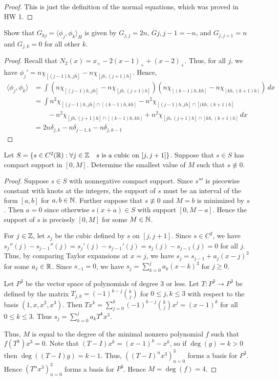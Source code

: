 \documentclass{article}
\begin{document}
\begin{proof}
This is just the definition of the normal equations, which was proved in HW 1.
\end{proof}

 Show that $G_{kj} = \langle \phi_j, \phi_k \rangle_H$ is given by
$G_{j,j} = 2n$, $G{j,j-1} = -n$, and $G_{j, j+1} = n$ and $G_{j,k} = 0$ for all other $k$.
\begin{proof}
Recall that $N_2(x) = x_+ - 2(x-1)_+ + (x-2)_+$. Thus, for all $j$, we have $\phi_j' = n \chi_{[(j-1)h, jh]} -n \chi_{[jh, (j+1)h]}$.  
Hence,
\begin{align*}
\langle \phi_j, \phi_k \rangle  & = \int (n \chi_{[(j-1)h, jh]} -n \chi_{[jh, (j+1)h]})(n \chi_{[(k-1)h, kh]} -n \chi_{[kh, (k+1)h]}) \, dx
\\ & = \int n^2 \chi_{[(j-1)h, jh] \cap [(k-1)h, kh]} - n^2 \chi_{[(j-1)h, jh] \cap [(kh, (k+1)h]}
\\ & \quad \quad - n^2 \chi_{[jh, (j+1)h] \cap [(k-1)h, kh]} + n^2 \chi_{[jh, (j+1)h] \cap [kh, (k+1)h]} \, dx
\\ & = 2n \delta_{j,k} - n \delta_{j-1, k} - n \delta_{j, k-1}
\end{align*}
\end{proof}


 Let $S = \{ s \in C^2(\mathbb{R}) : \forall j \in \mathbb{Z} \quad s \text{ is a cubic on } [j, j+1] \}$.  Suppose that $s \in S$ has compact support in $[0,M]$. Determine the smallest value of $M$ such that $s \not \equiv 0$.

\begin{proof}
Suppose $s \in S$ with nonnegative compact support. Since $s'''$ is piecewise constant with knots at the integers, the support of $s$ must be an interval of the form $[a,b]$ for $a,b \in \mathbb{N}$. Further suppose that $s \not \equiv 0$ and $M = b$ is minimized by $s$. Then $a = 0$ since otherwise $s(x+a) \in S$ with support $[0, M-a]$.  Hence the support of $s$ is precisely $[0,M]$ for some $M \in \mathbb{N}$.

For $j \in \mathbb{Z}$, let $s_j$ be the cubic defined by $s$ on $[j, j+1]$. Since $s \in C^2$, we have $s_{j}''(j) - s_{j-1}''(j) = s_{j}'(j) - s_{j-1}'(j) = s_{j}(j) - s_{j-1}(j) = 0$ for all $j$.  Thus, by comparing Taylor expansions at $x = j$, we have $s_{j} = s_{j-1} + a_j (x-j)^3$ for some $a_{j} \in \mathbb{R}$. Since $s_{-1} = 0$, we have $s_j = \sum_{k=0}^{j} a_k (x - k)^3$ for $j \ge 0$.

Let $P^3$ be the vector space of polynomials of degree $3$ or less. Let $T: P^3 \to P^3$ be defined by the matrix $T_{j,k} = (-1)^{k-j} {k \choose j}$ for $0 \le j,k \le 3$ with respect to the basis $(1, x, x^2, x^3)$. Then $T x^k = \sum_{j=0}^k (-1)^{k-j} {k \choose j} x^j = (x-1)^k$ for all $0 \le k \le 3$. Thus $s_j = \sum_{k=0}^{j} a_k T^k x^3$.

Thus, $M$ is equal to the degree of the minimal nonzero polynomial $f$ such that $f(T^k)x^3  = 0$. Note that $(T - I) x^k = (x - 1)^k - x^k$, so if $\deg(g) = k > 0$ then $\deg((T-I)g) = k - 1$.  Thus, $((T-I)^n x^3)_{n=0}^3$ forms a basis for $P^3$. Hence $(T^n x^3)_{n=0}^3$ forms a basis for $P^3$. Hence $M = \deg(f) = 4$.
\end{proof}
\end{document}
